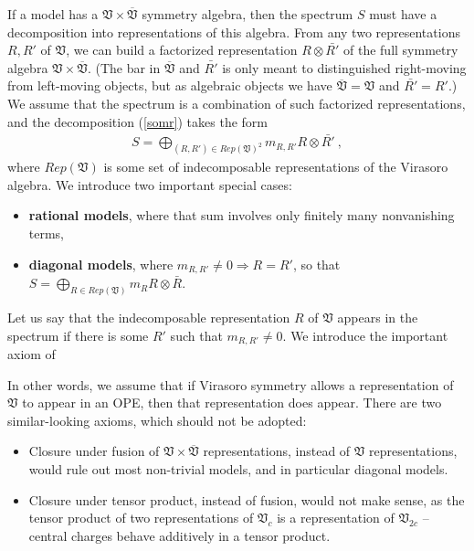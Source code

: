\documentclass[12pt,a4paper,notitlepage]{report}
\numberwithin{equation}{section}
\theoremstyle{break}
\begin{document}
If a model has a $\mathfrak{V}\times \overline{\mathfrak{V}}$ symmetry algebra, then the spectrum $S$ must have a decomposition into representations of this algebra. From any two representations $R,R'$ of $\mathfrak{V}$, we can build a factorized representation $R\otimes \bar{R'}$ of the full symmetry algebra $\mathfrak{V}\times \overline{\mathfrak{V}}$. (The bar in $\overline{\mathfrak{V}}$ and $\bar{R'}$ is only meant to distinguished right-moving from left-moving objects, but as algebraic objects we have $\overline{\mathfrak{V}}=\mathfrak{V}$ and $\bar{R'} = R'$.)
We assume that the spectrum is a combination of such factorized representations, and the decomposition (\ref{somr}) takes the form
\begin{align}
 \boxed{S = \bigoplus_{(R,R')\in Rep(\mathfrak{V})^2} m_{R,R'} R\otimes \bar{R'}}\ ,
\label{sorr}
\end{align}
where $Rep(\mathfrak{V})$ is some set of indecomposable representations of the Virasoro algebra.
We introduce two important special cases:
\begin{itemize}
\item \textbf{\boldmath rational models}, where that sum involves only finitely many nonvanishing terms,
 \item \textbf{\boldmath diagonal models}, where $m_{R,R'}\neq 0 \Rightarrow R=R'$, so that $S=\bigoplus_{R\in Rep(\mathfrak{V})} m_R R\otimes \bar{R}$.
\end{itemize}
Let us say that the indecomposable representation $R$ of $\mathfrak{V}$ appears in the spectrum if there is some $R'$ such that $m_{R,R'} \neq 0$.
We introduce the important axiom of 
\begin{center}
\end{center}
In other words, we assume that if Virasoro symmetry allows a representation of $\mathfrak{V}$ to appear in an OPE, then that representation does appear. There are two similar-looking axioms, which should not be adopted:
\begin{itemize}
 \item Closure under fusion of $\mathfrak{V}\times \overline{\mathfrak{V}}$ representations, instead of $\mathfrak{V}$ representations, would rule out most non-trivial models, and in particular diagonal models. 
\item Closure under tensor product, instead of fusion, would not make sense, as the tensor product of two representations of $\mathfrak{V}_c$ is a representation of $\mathfrak{V}_{2c}$ -- central charges behave additively in a tensor product. 
\end{itemize}
\end{document}

